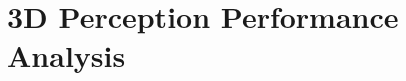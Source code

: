 \section{3D Perception Performance Analysis}  \label{sec:quan_3d}

\begin{comment}
\begin{center}
	\setlength\tabcolsep{4pt}
	\begin{tabularx}{\textwidth}{p{4cm}XXXX}
		\toprule
		\textbf{Classes} & \textbf{Precision} & \textbf{Recall} & \textbf{AP@10} & \textbf{$\triangle$AP Baseline} \\
		\midrule
		CAR & 32.81 & 17.31 & 28.52 & \textcolor{darkgreen}{+3.08} \\
		TRUCK & 10.74 & 5.32 & 8.63 & \textcolor{darkgreen}{+7.43} \\
		VAN & 2.28 & 0.02 & 0.00 & \textcolor{darkgreen}{0.00} \\
		BUS & 50.80 & 31.87 & 45.87 & \textcolor{darkgreen}{+2.50} \\
		PEDESTRIAN & 6.53 & 11.04 & 5.98 & \textcolor{darkred}{-0.23} \\
		BICYCLE & 11.80 & 30.18 & 11.54 & \textcolor{darkred}{-0.07} \\
		\midrule
		\textbf{mAP} & \textbf{} & \textbf{} & \textbf{12.60} &  \textbf{\textcolor{darkgreen}{+ 1.62}} \\
		\bottomrule
	\end{tabularx}
	\captionof{table}{YOLOv8x\_coco}
\end{center}
\end{comment}

